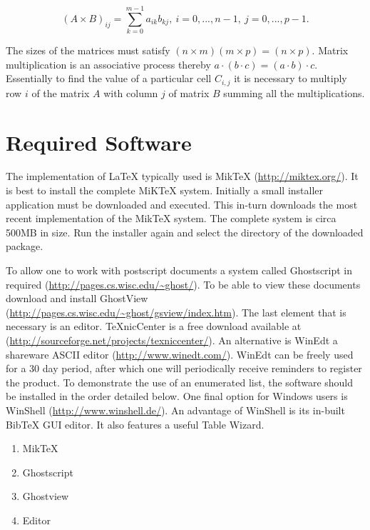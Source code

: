 \begin{equation}
(A \times B)_{ij} = \sum_{k=0} ^{m-1} a_{ik}b_{kj},~
i=0,...,n-1,~j=0,...,p-1.
\end{equation}

The sizes of the matrices must satisfy $(n \times m)(m \times p) =
(n \times p)$. Matrix multiplication is an associative process
thereby $a\cdot(b \cdot c) = (a \cdot b) \cdot c$. Essentially to
find the value of a particular cell $C_{i,j}$ it is necessary to
multiply row $i$ of the matrix $A$ with column $j$ of matrix $B$
summing all the multiplications.


\section{Required Software}

The implementation of \LaTeX \hspace{2 pt} typically used is MikTeX (\url{http://miktex.org/}). It is best to install the complete MiKTeX  system. Initially a small installer application must be downloaded and executed. This in-turn downloads the most recent implementation of the MikTeX system. The complete system is circa 500MB in size. Run the installer again and select the directory of the downloaded package.

To allow one to work with postscript documents a system called Ghostscript in required (\url{http://pages.cs.wisc.edu/~ghost/}). To be able to view these documents download and install GhostView (\url{http://pages.cs.wisc.edu/~ghost/gsview/index.htm}). The last element that is necessary is an editor. TeXnicCenter is a free download available at (\url{http://sourceforge.net/projects/texniccenter/}). An alternative is WinEdt a shareware ASCII editor (\url{http://www.winedt.com/}). WinEdt can be freely used for a 30 day period, after which one will periodically receive reminders to register the product. To demonstrate the use of an enumerated list, the software should be installed in the order detailed below. One final option for Windows users is WinShell (\url{http://www.winshell.de/}). An advantage of WinShell is its in-built BibTeX GUI editor. It also features a useful Table Wizard.

\begin{enumerate}
  \item MikTeX
  \item Ghostscript
  \item Ghostview
  \item Editor
\end{enumerate}


